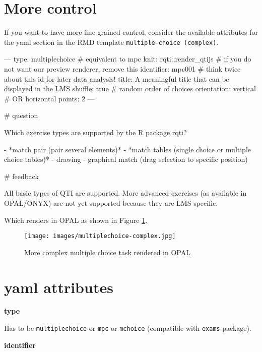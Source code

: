 \documentclass[twoside]{tufte-book}
\newenvironment{Shaded}{}{}
\begin{document}
\section{More control}\label{more-control-1}

If you want to have more fine-grained control, consider the available attributes for the yaml section in the RMD template \texttt{multiple-choice\ (complex)}.

\begin{Shaded}
\begin{Highlighting}
---
type: multiplechoice # equivalent to mpc
knit: rqti::render_qtijs # if you do not want our preview renderer, remove this
identifier: mpc001 # think twice about this id for later data analysis!
title: A meaningful title that can be displayed in the LMS
shuffle: true # random order of choices
orientation: vertical # OR horizontal
points: 2
---

# question

Which exercise types are supported by the R package rqti?

- *match pair (pair several elements)*
- *match tables (single choice or multiple choice tables)*
- drawing
- graphical match (drag selection to specific position)

# feedback

All basic types of QTI are supported. More advanced exercises (as available in
OPAL/ONYX) are not yet supported because they are LMS specific.
\end{Highlighting}
\end{Shaded}

Which renders in OPAL as shown in Figure \ref{mpc2opal}.

\begin{figure}
\centering
\texttt{[image: images/multiplechoice-complex.jpg]}
\caption{\label{mpc2opal}More complex multiple choice task rendered in OPAL}
\end{figure}

\section{yaml attributes}\label{yaml-attributes-1}

\noindent\textbf{type}\label{type-1}

Has to be \texttt{multiplechoice} or \texttt{mpc} or \texttt{mchoice} (compatible with \texttt{exams} package).

\noindent\textbf{identifier}\label{identifier-1}
\end{document}
